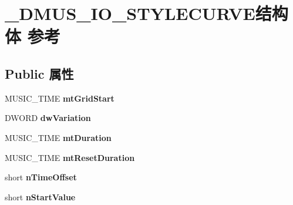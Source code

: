 \hypertarget{struct___d_m_u_s___i_o___s_t_y_l_e_c_u_r_v_e}{}\section{\+\_\+\+D\+M\+U\+S\+\_\+\+I\+O\+\_\+\+S\+T\+Y\+L\+E\+C\+U\+R\+V\+E结构体 参考}
\label{struct___d_m_u_s___i_o___s_t_y_l_e_c_u_r_v_e}
\subsection*{Public 属性}
\begin{DoxyCompactItemize}
\item 
\mbox{\label{struct___d_m_u_s___i_o___s_t_y_l_e_c_u_r_v_e_ad1fd35da447e401f1f5e5a6efad9f8de}} 
M\+U\+S\+I\+C\+\_\+\+T\+I\+ME {\bfseries mt\+Grid\+Start}
\item 
\mbox{\label{struct___d_m_u_s___i_o___s_t_y_l_e_c_u_r_v_e_a476bc96d464be5798fe90dd76aa844a3}} 
D\+W\+O\+RD {\bfseries dw\+Variation}
\item 
\mbox{\label{struct___d_m_u_s___i_o___s_t_y_l_e_c_u_r_v_e_ab9f83697541bad710944564871fe683b}} 
M\+U\+S\+I\+C\+\_\+\+T\+I\+ME {\bfseries mt\+Duration}
\item 
\mbox{\label{struct___d_m_u_s___i_o___s_t_y_l_e_c_u_r_v_e_ae6ec974a407eed1810ec57ca0534aa2c}} 
M\+U\+S\+I\+C\+\_\+\+T\+I\+ME {\bfseries mt\+Reset\+Duration}
\item 
\mbox{\label{struct___d_m_u_s___i_o___s_t_y_l_e_c_u_r_v_e_a11414d1582e6b8678a3755057237b3cb}} 
short {\bfseries n\+Time\+Offset}
\item 
\mbox{\label{struct___d_m_u_s___i_o___s_t_y_l_e_c_u_r_v_e_aca4c0ca6e5febd12dcce8612f46bab03}} 
short {\bfseries n\+Start\+Value}
\item 
\mbox{\label{struct___d_m_u_s___i_o___s_t_y_l_e_c_u_r_v_e_ac359cdd089427b21f7616f4004018207}} 

\end{DoxyCompactItemize}
